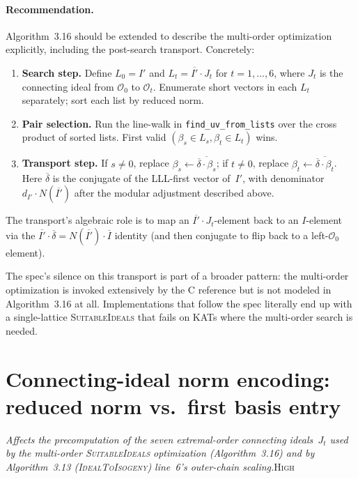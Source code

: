 \documentclass[a4paper,11pt]{article}
\newcommand{\algo}[1]{Algorithm~#1}
\newcommand{\high}{\textsc{\color{BurntOrange}High}}
\newcommand{\finding}[2]{\noindent\textit{#1}\hfill#2\par\smallskip}
\begin{document}
\paragraph{Recommendation.}
\algo{3.16} should be extended to describe the multi-order
optimization explicitly, including the post-search transport.
Concretely:
\begin{enumerate}
  \item \textbf{Search step.} Define
    $L_0 = I'$ and
    $L_t = \overline{I'} \cdot J_t$ for $t = 1, \ldots, 6$, where
    $J_t$ is the connecting ideal from $\mathcal{O}_0$ to
    $\mathcal{O}_t$.
    Enumerate short vectors in each $L_t$ separately; sort each
    list by reduced norm.
  \item \textbf{Pair selection.} Run the line-walk in
    \texttt{find\_uv\_from\_lists} over the cross product of
    sorted lists.  First valid $(\beta_s \in L_s,
    \beta_t \in L_t)$ wins.
  \item \textbf{Transport step.} If $s \neq 0$, replace
    $\beta_s \leftarrow \overline{\overline{\delta} \cdot \beta_s}$;
    if $t \neq 0$, replace
    $\beta_t \leftarrow \overline{\overline{\delta} \cdot \beta_t}$.
    Here $\overline{\delta}$ is the conjugate of the LLL-first
    vector of~$I'$, with denominator $d_{I'} \cdot N(\overline{I'})$
    after the modular adjustment described above.
\end{enumerate}
The transport's algebraic role is to map an
$\overline{I'} \cdot J_t$-element back to an $I$-element via the
$\overline{I'} \cdot \overline{\delta} = N(\overline{I'}) \cdot
\overline{I}$ identity (and then conjugate to flip back to a
left-$\mathcal{O}_0$ element).

The spec's silence on this transport is part of a broader pattern:
the multi-order optimization is invoked extensively by the C
reference but is not modeled in \algo{3.16} at all.  Implementations
that follow the spec literally end up with a single-lattice
\textsc{SuitableIdeals} that fails on KATs where the multi-order
search is needed.

\section{Connecting-ideal norm encoding: reduced norm vs.\ first
  basis entry}
\label{sec:specrev-connecting-ideal-norm}

\finding{Affects the precomputation of the seven extremal-order
connecting ideals~$J_t$ used by the multi-order
\textsc{SuitableIdeals} optimization (\algo{3.16}) and by
\algo{3.13} (\textsc{IdealToIsogeny}) line~6's outer-chain
scaling.}{\high}
\end{document}
